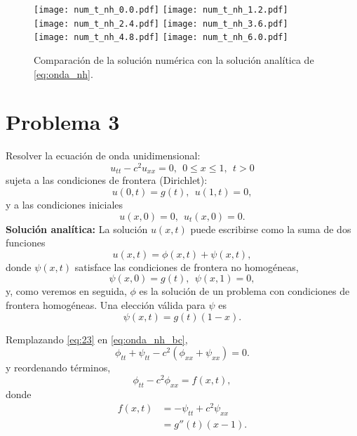 \documentclass[11pt]{article}
\begin{document}
\begin{figure}[h]
  \centering
    \texttt{[image: num\_t\_nh\_0.0.pdf]} 
  \texttt{[image: num\_t\_nh\_1.2.pdf]} \\
  \texttt{[image: num\_t\_nh\_2.4.pdf]} 
  \texttt{[image: num\_t\_nh\_3.6.pdf]} \\
  \texttt{[image: num\_t\_nh\_4.8.pdf]}
  \texttt{[image: num\_t\_nh\_6.0.pdf]}
  \caption{Comparaci\'on de la soluci\'on num\'erica con la soluci\'on anal\'itica de \eqref{eq:onda_nh}.}
  \label{fig:num_nh_dir}
\end{figure}




\clearpage
\section*{Problema 3}
Resolver la ecuaci\'on de onda unidimensional:
\begin{equation}
  \label{eq:onda_nh_bc}
  u_{tt} - c^2 u_{xx} = 0,~~0 \le x \le 1,~~t>0
\end{equation}
sujeta a las condiciones de frontera (Dirichlet):
\begin{equation}
  \label{eq:nh_dirich}
  u(0,t) = g(t),~~u(1,t) = 0,
\end{equation}
y a las condiciones iniciales
\begin{equation}
  \label{eq:6}
  u(x,0) = 0,~~u_t(x,0)=0.
\end{equation}
{\bf Soluci\'on anal\'itica:} La soluci\'on $u(x,t)$ puede escribirse como la suma de dos funciones
\begin{equation}
  \label{eq:23}
  u(x,t) = \phi(x,t) + \psi(x,t),
\end{equation}
donde $\psi(x,t)$ satisface las condiciones de frontera no homog\'eneas,
\begin{equation}
  \label{eq:28}
  \psi(x,0) = g(t),~~\psi(x,1) = 0,
\end{equation}
y, como veremos en seguida, $\phi$ es la soluci\'on de un problema con condiciones de frontera homog\'eneas. Una elecci\'on v\'alida para $\psi$ es
\begin{equation}
  \label{eq:31}
  \psi(x,t) = g(t)(1-x).
\end{equation}

Remplazando \eqref{eq:23} en \eqref{eq:onda_nh_bc},
\begin{equation}
  \label{eq:24}
  \phi_{tt} + \psi_{tt} - c^2(\phi_{xx} + \psi_{xx}) = 0.
\end{equation}
y reordenando t\'erminos,
\begin{equation}
  \label{eq:25}
  \phi_{tt} - c^2\phi_{xx} = f(x,t),
\end{equation}
donde
\begin{align}
  \label{eq:26}
  f(x,t) &= -\psi_{tt} + c^2\psi_{xx} \\
         &= g''(t)(x-1).
\end{align}
\end{document}
